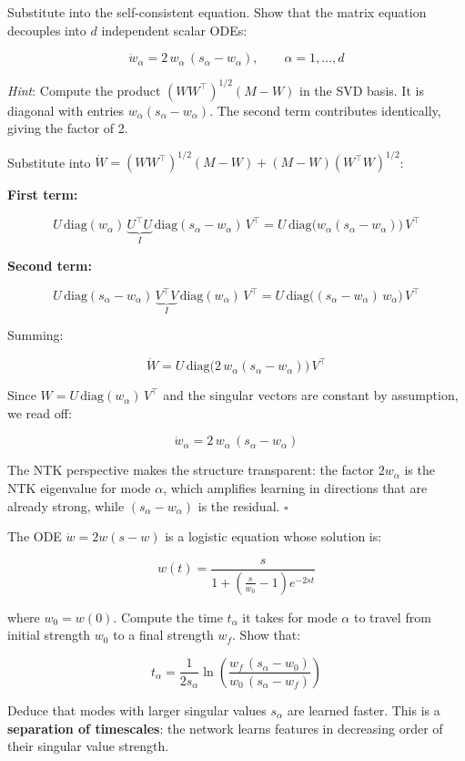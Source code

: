 \documentclass[11pt]{article}
\begin{document}
\begin{exercise}
\label{ex:td-3aii}
Substitute into the self-consistent equation. Show that
the matrix equation decouples into \(d\) independent scalar ODEs:

\[\dot{w}_\alpha = 2\,w_\alpha\,(s_\alpha - w_\alpha), \qquad \alpha = 1, \ldots, d\]

\emph{Hint}: Compute the product \((WW^\top)^{1/2}(M - W)\) in the SVD
basis. It is diagonal with entries \(w_\alpha(s_\alpha - w_\alpha)\).
The second term contributes identically, giving the factor of 2.
\end{exercise}

\begin{solution}[ex:td-3aii]
Substitute into
\(\dot{W} = (WW^\top)^{1/2}(M-W) + (M-W)(W^\top W)^{1/2}\):

\textbf{First term:}

\[U\,\text{diag}(w_\alpha)\,\underbrace{U^\top U}_{I}\,\text{diag}(s_\alpha - w_\alpha)\,V^\top = U\,\text{diag}\big(w_\alpha(s_\alpha - w_\alpha)\big)\,V^\top\]

\textbf{Second term:}

\[U\,\text{diag}(s_\alpha - w_\alpha)\,\underbrace{V^\top V}_{I}\,\text{diag}(w_\alpha)\,V^\top = U\,\text{diag}\big((s_\alpha - w_\alpha)\,w_\alpha\big)\,V^\top\]

Summing:

\[\dot{W} = U\,\text{diag}\big(2\,w_\alpha(s_\alpha - w_\alpha)\big)\,V^\top\]

Since \(W = U\,\text{diag}(w_\alpha)\,V^\top\) and the singular vectors
are constant by assumption, we read off:

\[\boxed{\dot{w}_\alpha = 2\,w_\alpha\,(s_\alpha - w_\alpha)}\]

The NTK perspective makes the structure transparent: the factor
\(2w_\alpha\) is the NTK eigenvalue for mode \(\alpha\), which amplifies
learning in directions that are already strong, while
\((s_\alpha - w_\alpha)\) is the residual. \(\square\)
\end{solution}

\begin{exercise}
\label{ex:td-3b}
The ODE
\(\dot{w} = 2w(s - w)\) is a logistic equation whose solution is:

\[w(t) = \frac{s}{1 + \left(\frac{s}{w_0} - 1\right)e^{-2st}}\]

where \(w_0 = w(0)\). Compute the time \(t_\alpha\) it takes for mode
\(\alpha\) to travel from initial strength \(w_0\) to a final strength
\(w_f\). Show that:

\[t_\alpha = \frac{1}{2 s_\alpha} \ln\left(\frac{w_f\,(s_\alpha - w_0)}{w_0\,(s_\alpha - w_f)}\right)\]

Deduce that modes with larger singular values \(s_\alpha\) are learned
faster. This is a \textbf{separation of timescales}: the network learns
features in decreasing order of their singular value strength.
\end{exercise}
\end{document}
